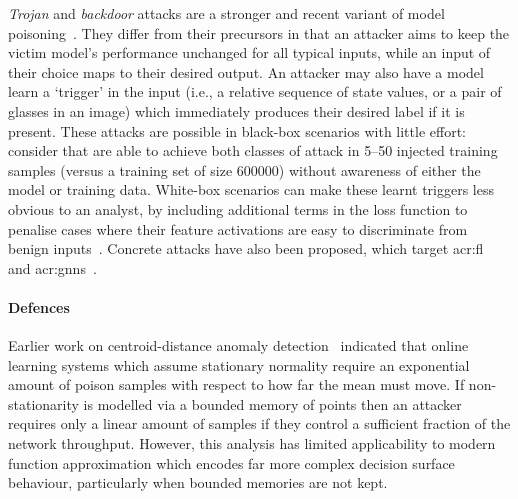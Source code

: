 \emph{Trojan} and \emph{backdoor} attacks are a stronger and recent variant of model poisoning~\parencite{DBLP:journals/corr/abs-1712-05526}.
They differ from their precursors in that an attacker aims to keep the victim model's performance unchanged for all typical inputs, while an input of their choice maps to their desired output.
An attacker may also have a model learn a `trigger' in the input (i.e., a relative sequence of state values, or a pair of glasses in an image) which immediately produces their desired label if it is present.
These attacks are possible in black-box scenarios with little effort: consider that \citeauthor{DBLP:journals/corr/abs-1712-05526} are able to achieve both classes of attack in \numrange{5}{50} injected training samples (versus a training set of size \num{600000}) without awareness of either the model or training data.
White-box scenarios can make these learnt triggers less obvious to an analyst, by including additional terms in the loss function to penalise cases where their feature activations are easy to discriminate from benign inputs~\parencite{DBLP:conf/eurosp/TanS20}.
Concrete attacks have also been proposed, which target \gls{acr:fl}~\parencite{DBLP:conf/aistats/BagdasaryanVHES20} and \glspl{acr:gnn}~\parencite{DBLP:conf/uss/XiPJ021}.


\paragraph{Defences}
Earlier work on centroid-distance anomaly detection~\parencite{DBLP:journals/jmlr/KloftL10} indicated that online learning systems which assume stationary normality require an exponential amount of poison samples with respect to how far the mean must move.
If non-stationarity is modelled via a bounded memory of points then an attacker requires only a linear amount of samples if they control a sufficient fraction of the network throughput.
However, this analysis has limited applicability to modern function approximation which encodes far more complex decision surface behaviour, particularly when bounded memories are not kept.

